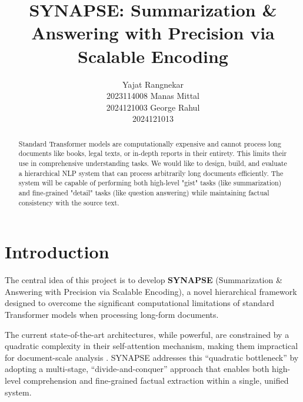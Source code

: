 \documentclass[11pt]{article}
\title{SYNAPSE: Summarization \& Answering with Precision via Scalable Encoding}
\author{ Yajat Rangnekar \\
2023114008 \And
  Manas Mittal \\
2024121003\And
  George Rahul \\
2024121013}
\begin{document}
\maketitle

\begin{abstract}
Standard Transformer models are computationally expensive and cannot process long documents like books, legal texts, or in-depth reports in their entirety. This limits their use in comprehensive understanding tasks. We would like to design, build, and evaluate a hierarchical NLP system that can process arbitrarily long documents efficiently. The system will be capable of performing both high-level "gist" tasks (like summarization) and fine-grained "detail" tasks (like question answering) while maintaining factual consistency with the source text.
\end{abstract}

\section{Introduction}

The central idea of this project is to develop \textbf{SYNAPSE} (Summarization \& Answering with Precision via Scalable Encoding), a novel hierarchical framework designed to overcome the significant computational limitations of standard Transformer models when processing long-form documents. 

The current state-of-the-art architectures, while powerful, are constrained by a quadratic complexity in their self-attention mechanism, making them impractical for document-scale analysis \citep{vaswani2023attentionneed}. SYNAPSE addresses this ``quadratic bottleneck'' by adopting a multi-stage, ``divide-and-conquer'' approach that enables both high-level comprehension and fine-grained factual extraction within a single, unified system.
\end{document}
